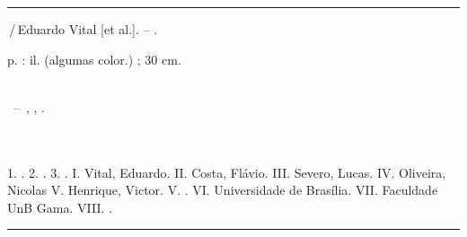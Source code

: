 \begin{fichacatalografica}
	\vspace*{\fill}					%
	\hrule							%
	\begin{center}					%
	\begin{minipage}[c]{12.5cm}		%

	\imprimirautorunico

	\hspace{0.5cm} \imprimirtitulo\,/\,Eduardo Vital [et al.]. -- \imprimirdata.

	\hspace{0.5cm} \pageref{LastPage} p. : il. (algumas color.) ; 30 cm.\\

	\hspace{0.5cm} \imprimirorientadorRotulo~\imprimirorientador\\

	\hspace{0.5cm}
	\parbox[t]{\textwidth}{\imprimirtipotrabalho~--~\imprimirinstituicao, \imprimirlocal, \imprimirdata.}\\\\

	\hspace{0.5cm}
		1. \imprimirpalavrachaveum.
		2. \imprimirpalavrachavedois.
		3. \imprimirpalavrachavetres.
		I. Vital, Eduardo.
		II. Costa, Flávio.
		III. Severo, Lucas.
		IV. Oliveira, Nicolas
		V. Henrique, Victor.
		V. \imprimirorientador.
		VI. Universidade de Brasília.
		VII. Faculdade UnB Gama.
		VIII. \imprimirtitulo.\\
	\end{minipage}
	\end{center}
	\hrule
\end{fichacatalografica}
\clearpage
